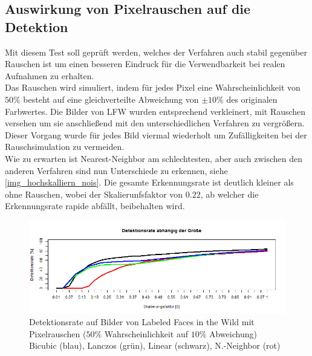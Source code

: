 \subsection{Auswirkung von Pixelrauschen auf die Detektion}
Mit diesem Test soll geprüft werden, welches der Verfahren auch stabil gegenüber Rauschen ist um einen besseren Eindruck für die Verwendbarkeit bei realen Aufnahmen zu erhalten.\\
Das Rauschen wird simuliert, indem für jedes Pixel eine Wahrscheinlichkeit von $50\%$ besteht auf eine gleichverteilte Abweichung von $\pm 10\%$ des originalen Farbwertes. Die Bilder von LFW \cite{database_Face} wurden entsprechend verkleinert, mit Rauschen versehen um sie anschließend mit den unterschiedlichen Verfahren zu vergrößern. Dieser Vorgang wurde für jedes Bild viermal wiederholt um Zufälligkeiten bei der Rauschsimulation zu vermeiden.\\
Wie zu erwarten ist Nearest-Neighbor am schlechtesten, aber auch zwischen den anderen Verfahren sind nun Unterschiede zu erkennen, siehe \autoref{img_hochskalliern_nois}. Die gesamte Erkennungsrate ist deutlich kleiner als ohne Rauschen, wobei der Skalierunfsfaktor von $0.22$, ab welcher die Erkennungsrate rapide abfällt, beibehalten wird.
\begin{figure}
	\centering
	\includegraphics[width=\linewidth]{img_Skalierung/Hochskalliern_Nois}
	\caption{Detektionsrate auf Bilder von Labeled Faces in the Wild \cite{database_Face} mit Pixelrauschen ($50\%$ Wahrscheinlichkeit auf $10\%$ Abweichung)\\Bicubic (blau), Lanczos (grün), Linear (schwarz), N.-Neighbor (rot)}
	\label{img_hochskalliern_nois}
\end{figure}

